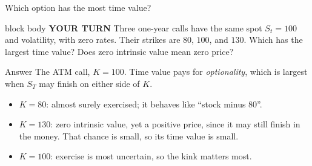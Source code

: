 \documentclass[handout,10pt,aspectratio=169]{beamer}
\newenvironment{pausebox}{\begin{beamercolorbox}[rounded=true,sep=0.8em,wd=\textwidth]{block body}
  \textbf{\color{CourseGold}YOUR TURN}\quad}{\end{beamercolorbox}}
\newcommand{\1}{\mathbf 1}
\begin{document}
\begin{frame}{Which option has the most time value?}
\begin{pausebox}
Three one-year calls have the same spot \(S_t=100\) and volatility, with
zero rates. Their strikes are \(80\), \(100\), and \(130\).
Which has the largest time value? Does zero intrinsic value mean zero price?
\end{pausebox}

\begin{exampleblock}{Answer}
The ATM call, \(K=100\). Time value pays for \emph{optionality}, which is
largest when \(S_T\) may finish on either side of \(K\).
\begin{itemize}
\item \(K=80\): almost surely exercised; it behaves like ``stock minus \(80\)''.
\item \(K=130\): zero intrinsic value, yet a positive price, since it may still
      finish in the money. That chance is small, so its time value is small.
\item \(K=100\): exercise is most uncertain, so the kink matters most.
\end{itemize}
\end{exampleblock}
\end{frame}
\end{document}
